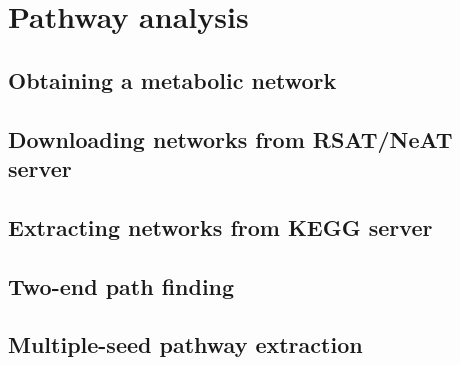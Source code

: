 \section{Pathway analysis}


\subsection{Obtaining a metabolic network}

\subsection{Downloading networks from RSAT/NeAT server}



\subsection{Extracting networks from KEGG server}


\subsection{Two-end path finding}


\subsection{Multiple-seed pathway extraction}


